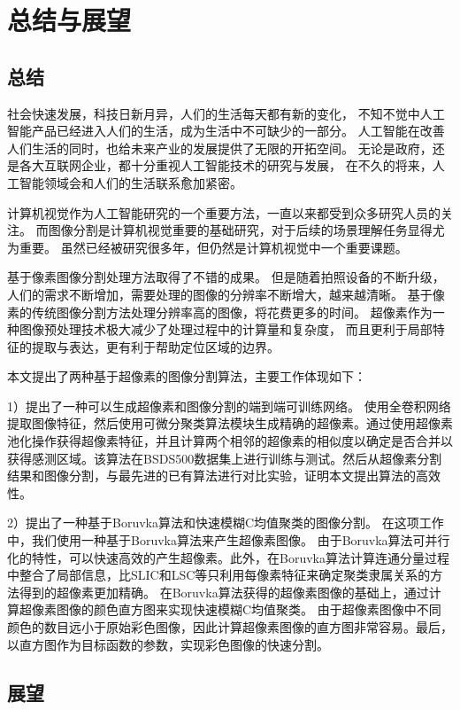 
\chapter{总结与展望}

\section{总结}

社会快速发展，科技日新月异，人们的生活每天都有新的变化，
不知不觉中人工智能产品已经进入人们的生活，成为生活中不可缺少的一部分。
人工智能在改善人们生活的同时，也给未来产业的发展提供了无限的开拓空间。
无论是政府，还是各大互联网企业，都十分重视人工智能技术的研究与发展，
在不久的将来，人工智能领域会和人们的生活联系愈加紧密。

计算机视觉作为人工智能研究的一个重要方法，一直以来都受到众多研究人员的关注。
而图像分割是计算机视觉重要的基础研究，对于后续的场景理解任务显得尤为重要。
虽然已经被研究很多年，但仍然是计算机视觉中一个重要课题。

基于像素图像分割处理方法取得了不错的成果。
但是随着拍照设备的不断升级，人们的需求不断增加，需要处理的图像的分辨率不断增大，越来越清晰。
基于像素的传统图像分割方法处理分辨率高的图像，将花费更多的时间。
超像素作为一种图像预处理技术极大减少了处理过程中的计算量和复杂度，
而且更利于局部特征的提取与表达，更有利于帮助定位区域的边界。

本文提出了两种基于超像素的图像分割算法，主要工作体现如下：

 1）提出了一种可以生成超像素和图像分割的端到端可训练网络。
 使用全卷积网络提取图像特征，然后使用可微分聚类算法模块生成精确的超像素。通过使用超像素池化操作获得超像素特征，并且计算两个相邻的超像素的相似度以确定是否合并以获得感测区域。该算法在BSDS500数据集上进行训练与测试。然后从超像素分割结果和图像分割，与最先进的已有算法进行对比实验，证明本文提出算法的高效性。

 2）提出了一种基于Boruvka算法和快速模糊C均值聚类的图像分割。
 在这项工作中，我们使用一种基于Boruvka算法来产生超像素图像。
 由于Boruvka算法可并行化的特性，可以快速高效的产生超像素。此外，在Boruvka算法计算连通分量过程中整合了局部信息，比SLIC和LSC等只利用每像素特征来确定聚类隶属关系的方法得到的超像素更加精确。
 在Boruvka算法获得的超像素图像的基础上，通过计算超像素图像的颜色直方图来实现快速模糊C均值聚类。
 由于超像素图像中不同颜色的数目远小于原始彩色图像，因此计算超像素图像的直方图非常容易。最后，以直方图作为目标函数的参数，实现彩色图像的快速分割。

\section{展望}

